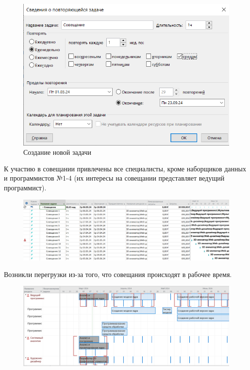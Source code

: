 \begin{figure}[h!]
	\begin{center}
		\includegraphics[scale=0.75]{inc/img/p_5.png}
	\end{center}
	\captionsetup{justification=centering}
	\caption{Создание новой задачи}
	\label{fig:u3}
\end{figure}

К участию в совещании привлечены все специалисты, кроме
наборщиков данных и программистов №1-4 (их интересы на совещании представляет ведущий программист). 

\begin{figure}[h!]
	\begin{center}
		\includegraphics[scale=0.4]{inc/img/p_6.png}
	\end{center}
	\captionsetup{justification=centering}
	\label{fig:u3}
\end{figure}

Возникли перегрузки из-за того, что совещания происходят в рабочее время.

\begin{figure}[h!]
	\begin{center}
		\includegraphics[scale=0.43]{inc/img/p_7.png}
	\end{center}
	\captionsetup{justification=centering}
	\label{fig:u3}
\end{figure}

